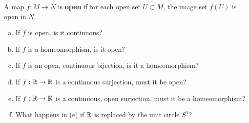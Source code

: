 \documentclass[a4paper, 11pt]{article}
\begin{document}
\begin{problem} [2.28]
A map $f: M \to N$ is \textbf{open} if for each open set $U \subset M$, the image set $f(U)$ is open in $N$.
\begin{enumerate} [(a)]
    \item If $f$ is open, is it continuous?
    \item If $f$ is a homeomorphism, is it open?
    \item If $f$ is an open, continuous bijection, is it a homeomorphism?
    \item If $f: \mathbb{R} \to \mathbb{R}$ is a continuous surjection, must it be open?
    \item If $f: \mathbb{R} \to \mathbb{R}$ is a continuous, open surjection, must it be a homeomorphism?
    \item What happens in (e) if $\mathbb{R}$ is replaced by the unit circle $S^1$?
\end{enumerate}
\end{problem}
\end{document}
